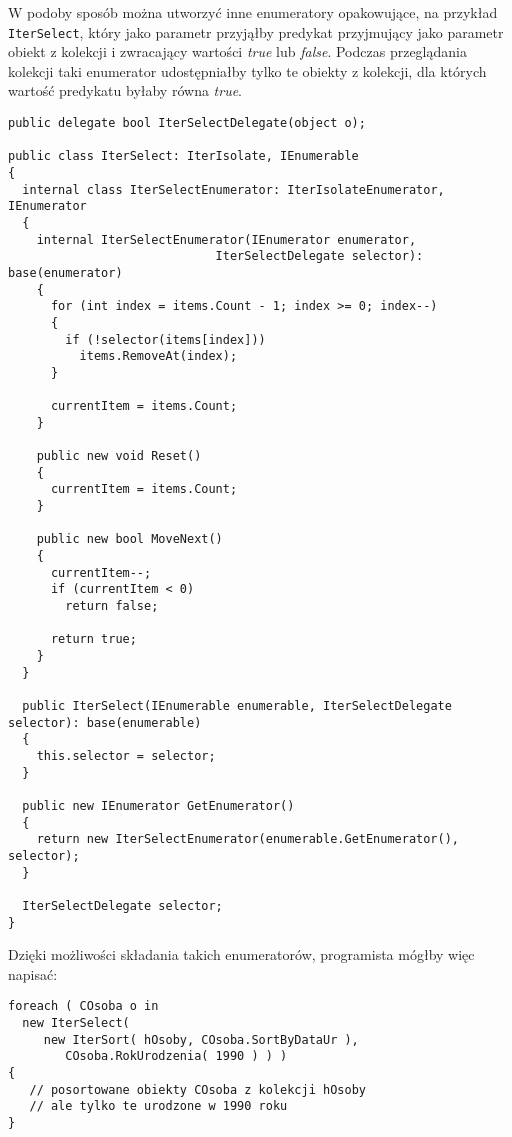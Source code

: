 W podoby sposób można utworzyć inne enumeratory opakowujące, na przykład {\tt IterSelect}, który jako
parametr przyjąłby predykat przyjmujący jako parametr obiekt z kolekcji i zwracający wartości 
{\em true} lub {\em false}. Podczas przeglądania kolekcji taki enumerator udostępniałby tylko
te obiekty z kolekcji, dla których wartość predykatu byłaby równa {\em true}. 

\begin{scriptsize}
\begin{verbatim}
public delegate bool IterSelectDelegate(object o);
	
public class IterSelect: IterIsolate, IEnumerable
{
  internal class IterSelectEnumerator: IterIsolateEnumerator, IEnumerator
  {
    internal IterSelectEnumerator(IEnumerator enumerator, 
                             IterSelectDelegate selector): base(enumerator)
    {
      for (int index = items.Count - 1; index >= 0; index--)
      {
        if (!selector(items[index]))
          items.RemoveAt(index);
      }

      currentItem = items.Count;
    }

    public new void Reset()
    {
      currentItem = items.Count;
    }

    public new bool MoveNext()
    {
      currentItem--;
      if (currentItem < 0)
        return false;

      return true;
    }
  }

  public IterSelect(IEnumerable enumerable, IterSelectDelegate selector): base(enumerable)
  {
    this.selector = selector;
  }

  public new IEnumerator GetEnumerator()
  {
    return new IterSelectEnumerator(enumerable.GetEnumerator(), selector);
  }

  IterSelectDelegate selector;
}
\end{verbatim}
\end{scriptsize}

Dzięki możliwości składania takich enumeratorów, programista mógłby więc napisać:

\begin{scriptsize}
\begin{verbatim}
foreach ( COsoba o in 
  new IterSelect( 
     new IterSort( hOsoby, COsoba.SortByDataUr ), 
        COsoba.RokUrodzenia( 1990 ) ) )
{
   // posortowane obiekty COsoba z kolekcji hOsoby
   // ale tylko te urodzone w 1990 roku
}
\end{verbatim}
\end{scriptsize}

